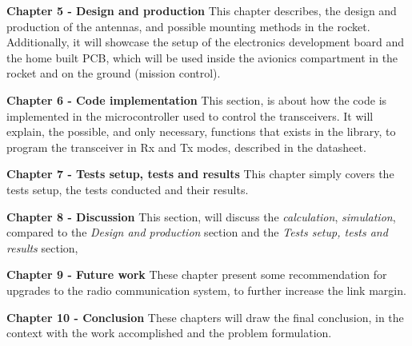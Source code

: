 \textbf{Chapter 5 - Design and production}
This chapter describes, the design and production of the antennas, and possible mounting methods in the rocket. Additionally, it will showcase the setup of the electronics development board and the home built PCB, which will be used inside the avionics compartment in the rocket and on the ground (mission control). 

\textbf{Chapter 6 - Code implementation}
This section, is about how the code is implemented in the microcontroller used to control the transceivers. It will explain, the possible, and only necessary, functions that exists in the library, to program the transceiver in Rx and Tx modes, described in the datasheet\cite{nrf24l01+}.  

\textbf{Chapter 7 - Tests setup, tests and results}
This chapter simply covers the tests setup, the tests conducted and their results. 

\textbf{Chapter 8 - Discussion}
This section, will discuss the \textit{calculation}, \textit{simulation}, compared to the \textit{Design and production} section and the \textit{Tests setup, tests and results} section,

\textbf{Chapter 9 - Future work}
These chapter present some recommendation for upgrades to the radio communication system, to further increase the link margin. 


\textbf{Chapter 10 - Conclusion}
These chapters will draw the final conclusion, in the context with the work accomplished and the problem formulation. 




